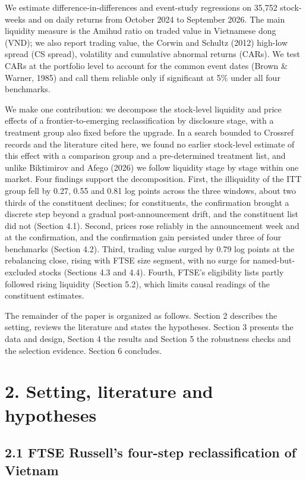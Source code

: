 We estimate difference-in-differences and event-study regressions on
35,752 stock-weeks and on daily returns from October 2024 to September
2026. The main liquidity measure is the Amihud ratio on traded value in
Vietnamese dong (VND); we also report trading value, the Corwin and
Schultz (2012) high-low spread (CS spread), volatility and cumulative
abnormal returns (CARs). We test CARs at the portfolio level to account
for the common event dates (Brown \& Warner, 1985) and call them
reliable only if significant at 5\% under all four benchmarks.

We make one contribution: we decompose the stock-level liquidity and
price effects of a frontier-to-emerging reclassification by disclosure
stage, with a treatment group also fixed before the upgrade. In a search
bounded to Crossref records and the literature cited here, we found no
earlier stock-level estimate of this effect with a comparison group and
a pre-determined treatment list, and unlike Biktimirov and Afego (2026)
we follow liquidity stage by stage within one market. Four findings
support the decomposition. First, the illiquidity of the ITT group fell
by 0.27, 0.55 and 0.81 log points across the three windows, about two
thirds of the constituent declines; for constituents, the confirmation
brought a discrete step beyond a gradual post-announcement drift, and
the constituent list did not (Section 4.1). Second, prices rose reliably
in the announcement week and at the confirmation, and the confirmation
gain persisted under three of four benchmarks (Section 4.2). Third,
trading value surged by 0.79 log points at the rebalancing close, rising
with FTSE size segment, with no surge for named-but-excluded stocks
(Sections 4.3 and 4.4). Fourth, FTSE's eligibility lists partly followed
rising liquidity (Section 5.2), which limits causal readings of the
constituent estimates.

The remainder of the paper is organized as follows. Section 2 describes
the setting, reviews the literature and states the hypotheses. Section 3
presents the data and design, Section 4 the results and Section 5 the
robustness checks and the selection evidence. Section 6 concludes.

\hypertarget{setting-literature-and-hypotheses}{%
\section{2. Setting, literature and
hypotheses}\label{setting-literature-and-hypotheses}}

\hypertarget{ftse-russells-four-step-reclassification-of-vietnam}{%
\subsection{2.1 FTSE Russell's four-step reclassification of
Vietnam}\label{ftse-russells-four-step-reclassification-of-vietnam}}

